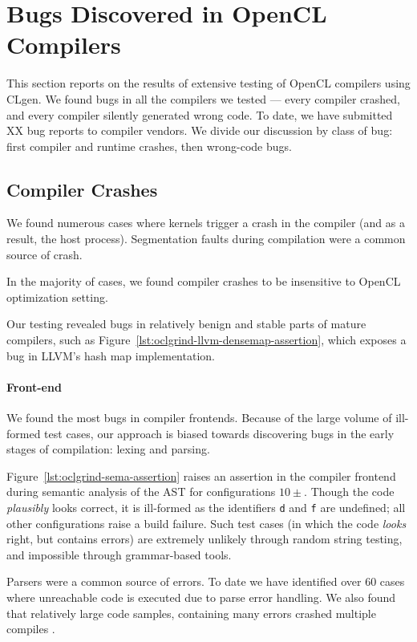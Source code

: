 \section{Bugs Discovered in OpenCL Compilers}

This section reports on the results of extensive testing of OpenCL compilers using CLgen. We found bugs in all the compilers we tested --- every compiler crashed, and every compiler silently generated wrong code. To date, we have submitted XX bug reports to compiler vendors. We divide our discussion by class of bug: first compiler and runtime crashes, then wrong-code bugs.

\subsection{Compiler Crashes}

We found numerous cases where kernels trigger a crash in the compiler (and as a result, the host process). Segmentation faults during compilation were a common source of crash.

In the majority of cases, we found compiler crashes to be insensitive to OpenCL optimization setting.

Our testing revealed bugs in relatively benign and stable parts of mature compilers, such as Figure~\ref{lst:oclgrind-llvm-densemap-assertion}, which exposes a bug in LLVM's hash map implementation.

\paragraph{Front-end} We found the most bugs in compiler frontends. Because of the large volume of ill-formed test cases, our approach is biased towards discovering bugs in the early stages of compilation: lexing and parsing.

Figure~\ref{lst:oclgrind-sema-assertion} raises an assertion in the compiler frontend during semantic analysis of the AST for configurations $10\pm$. Though the code \emph{plausibly} looks correct, it is ill-formed as the identifiers \texttt{d} and \texttt{f} are undefined; all other configurations raise a build failure. Such test cases (in which the code \emph{looks} right, but contains errors) are extremely unlikely through random string testing, and impossible through grammar-based tools.

Parsers were a common source of errors. To date we have identified over 60 cases where unreachable code is executed due to parse error handling. We also found that relatively large code samples, containing many errors crashed multiple compiles .

